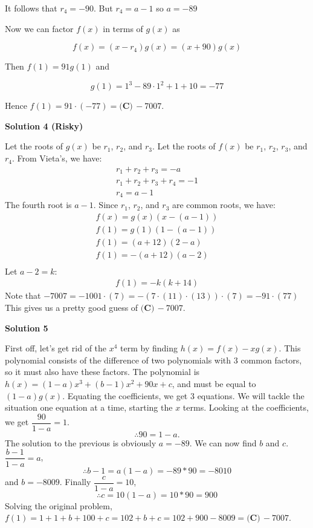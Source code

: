 \begin{enumerate}
 It follows that $r_4=-90$. But $r_4=a-1$ so $a=-89$

 Now we can factor $f(x)$ in terms of $g(x)$ as

 
 \[f(x)=(x-r_4)g(x)=(x+90)g(x)\]

 Then $f(1)=91g(1)$ and

 
 \[g(1)=1^3-89\cdot 1^2+1+10=-77\]

 Hence $f(1)=91\cdot(-77)=\boxed{\textbf{(C)}\,-7007}$.

 



\textbf{Solution 4 (Risky)}

Let the roots of $g(x)$ be $r_1$, $r_2$, and $r_3$. Let the roots of $f(x)$ be $r_1$, $r_2$, $r_3$, and $r_4$. From Vieta's, we have:
 \begin{align*} r_1+r_2+r_3=-a \\ r_1+r_2+r_3+r_4=-1 \\ r_4=a-1 \end{align*}
The fourth root is $a-1$. Since $r_1$, $r_2$, and $r_3$ are common roots, we have:
 \begin{align*} f(x)=g(x)(x-(a-1)) \\ f(1)=g(1)(1-(a-1)) \\ f(1)=(a+12)(2-a) \\ f(1)=-(a+12)(a-2) \\ \end{align*}
Let $a-2=k$:
 \begin{align*} f(1)=-k(k+14) \end{align*}
Note that $-7007=-1001\cdot(7)=-(7\cdot(11)\cdot(13))\cdot(7)=-91\cdot(77)$This gives us a pretty good guess of $\boxed{\textbf{(C)}\, -7007}$.

 



\textbf{Solution 5}

First off, let's get rid of the $x^4$ term by finding $h(x)=f(x)-xg(x)$. This polynomial consists of the difference of two polynomials with $3$ common factors, so it must also have these factors. The polynomial is $h(x)=(1-a)x^3 + (b-1)x^2 + 90x + c$, and must be equal to $(1-a)g(x)$. Equating the coefficients, we get $3$ equations. We will tackle the situation one equation at a time, starting the $x$ terms. Looking at the coefficients, we get $\dfrac{90}{1-a} = 1$. 
 \[\therefore 90=1-a.\] The solution to the previous is obviously $a=-89$. We can now find $b$ and $c$. $\dfrac{b-1}{1-a} = a$, 
 \[\therefore b-1=a(1-a)=-89*90=-8010\] and $b=-8009$. Finally $\dfrac{c}{1-a} = 10$, 
 \[\therefore c=10(1-a)=10*90=900\] Solving the original problem, $f(1)=1 + 1 + b + 100 + c = 102+b+c=102+900-8009=\boxed{\textbf{(C)}\, -7007}$.


\end{enumerate}
